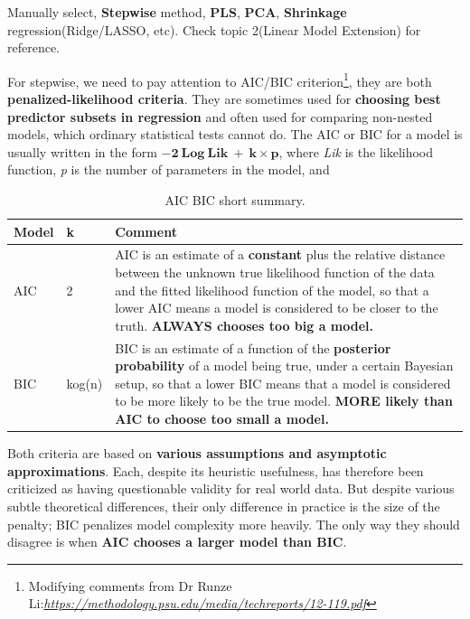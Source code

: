 Manually select, \textbf{Stepwise} method, \textbf{PLS}, \textbf{PCA},
\textbf{Shrinkage} regression(Ridge/LASSO, etc). Check topic 2(Linear
Model Extension) for reference.

For stepwise, we need to pay attention to AIC/BIC criterion\footnote{Modifying
	comments from Dr Runze
	Li:\href{https://methodology.psu.edu/media/techreports/12-119.pdf}{\emph{https://methodology.psu.edu/media/techreports/12-119.pdf}}},
they are both \textbf{penalized-likelihood criteria}. They are sometimes
used for \textbf{choosing best predictor subsets in regression} and
often used for comparing non-nested models, which ordinary statistical
tests cannot do. The AIC or BIC for a model is usually written in the
form \(\mathbf{- 2\ Log\ Lik\  + \ k \times p}\), where \emph{Lik} is
the likelihood function, \emph{p} is the number of parameters in the
model, and

\begin{table}
	\centering
	\begin{tabularx}{.475\textwidth}{|l|l|X|}
		\hline
		\textbf{Model} & \textbf{k} & \textbf{Comment}\\\hline
		AIC & 2 & AIC is an estimate of a \textbf{constant} plus the relative
		distance between the unknown true likelihood function of the data and
		the fitted likelihood function of the model, so that a lower AIC means a
		model is considered to be closer to the truth. \textbf{ALWAYS chooses
			too big a model.}\\
		BIC & kog(n) & BIC is an estimate of a function of the \textbf{posterior
			probability} of a model being true, under a certain Bayesian setup, so
		that a lower BIC means that a model is considered to be more likely to
		be the true model. \textbf{MORE likely than AIC to choose too small a
			model.}\\\hline
	\end{tabularx}
	\caption{AIC BIC short summary.}\label{table::aicbiclm}
\end{table}


Both criteria are based on \textbf{various assumptions and asymptotic
	approximations}. Each, despite its heuristic usefulness, has therefore
been criticized as having questionable validity for real world data. But
despite various subtle theoretical differences, their only difference in
practice is the size of the penalty; BIC penalizes model complexity more
heavily. The only way they should disagree is when \textbf{AIC chooses a
	larger model than BIC}.

